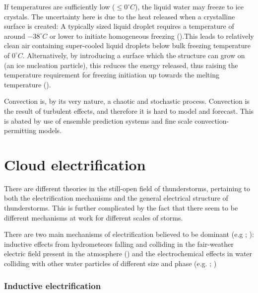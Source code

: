 If temperatures are sufficiently low ($\leq 0 ^{\circ} C$), the liquid water may freeze to ice crystals. The uncertainty here is due to the heat released when a crystalline surface is created: A typically sized liquid droplet requires a temperature of around $ -38 ^{\circ} C$ or lower to initiate homogeneous freezing (\cite{Skyfysikk}).This leads to relatively clean air containing super-cooled liquid droplets below bulk freezing temperature of $0 ^{\circ} C$. Alternatively, by introducing a surface which the structure can grow on (an ice nucleation particle), this reduces the energy released, thus raising the temperature requirement for freezing initiation up towards the melting temperature (\cite{jeffery1997}). 

Convection is, by its very nature, a chaotic and stochastic process. Convection is the result of turbulent effects, and therefore it is hard to model and forecast. This is abated by use of ensemble prediction systems and fine scale convection-permitting models. 

\section{Cloud electrification}

There are different theories in the still-open field of thunderstorms, pertaining to both the electrification mechanisms and the general electrical structure of thunderstorms. This is further complicated by the fact that there seem to be different mechanisms at work for different scales of storms.

There are two main mechanisms of electrification believed to be dominant (e.g \cite{saunders2008}; \cite{soula2012}): inductive effects from hydrometeors falling and colliding in the fair-weather electric field present in the atmosphere (\cite{harrison2012}) and the electrochemical effects in water colliding with other water particles of different size and phase (e.g. \cite{rydock1991}; \cite{kallay2015})

\subsubsection{Inductive electrification}

